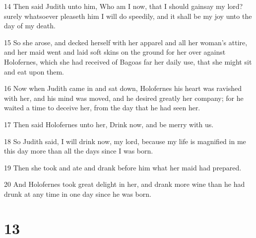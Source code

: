 \par 14 Then said Judith unto him, Who am I now, that I should gainsay my lord? surely whatsoever pleaseth him I will do speedily, and it shall be my joy unto the day of my death.
\par 15 So she arose, and decked herself with her apparel and all her woman's attire, and her maid went and laid soft skins on the ground for her over against Holofernes, which she had received of Bagoas far her daily use, that she might sit and eat upon them.
\par 16 Now when Judith came in and sat down, Holofernes his heart was ravished with her, and his mind was moved, and he desired greatly her company; for he waited a time to deceive her, from the day that he had seen her.
\par 17 Then said Holofernes unto her, Drink now, and be merry with us.
\par 18 So Judith said, I will drink now, my lord, because my life is magnified in me this day more than all the days since I was born.
\par 19 Then she took and ate and drank before him what her maid had prepared.
\par 20 And Holofernes took great delight in her, and drank more wine than he had drunk at any time in one day since he was born.

\chapter{13}


